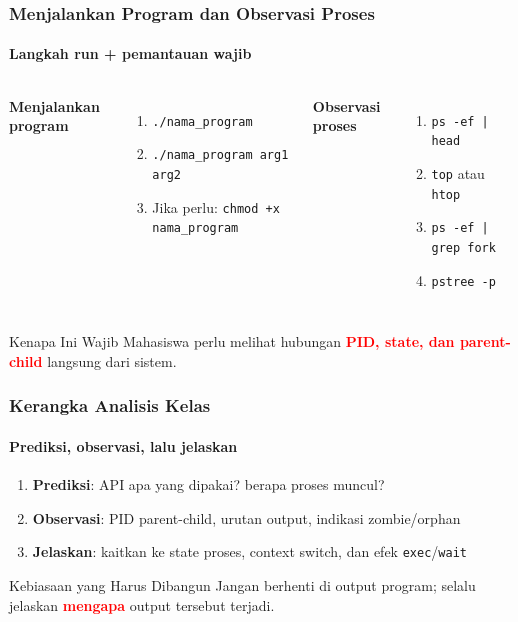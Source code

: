 \documentclass[t,aspectratio=169,xcolor=dvipsnames]{beamer}
\newcommand{\tem}[1]{\textbf{\textcolor{red}{#1}}}
\begin{document}
\begin{frame}
    \frametitle{Menjalankan Program dan Observasi Proses}
    \framesubtitle{Langkah run + pemantauan wajib}
    \small
    \begin{columns}[T]
        \textbf{Menjalankan program}
        \begin{enumerate}
            \item \texttt{./nama\_program}
            \item \texttt{./nama\_program arg1 arg2}
            \item Jika perlu: \texttt{chmod +x nama\_program}
        \end{enumerate}
        \textbf{Observasi proses}
        \begin{enumerate}
            \item \texttt{ps -ef | head}
            \item \texttt{top} atau \texttt{htop}
            \item \texttt{ps -ef | grep fork}
            \item \texttt{pstree -p}
        \end{enumerate}
    \end{columns}
    \begin{block}{Kenapa Ini Wajib}
        Mahasiswa perlu melihat hubungan \tem{PID, state, dan parent-child} langsung dari sistem.
    \end{block}
\end{frame}

\begin{frame}
    \frametitle{Kerangka Analisis Kelas}
    \framesubtitle{Prediksi, observasi, lalu jelaskan}
    \small
    \begin{enumerate}
        \item \textbf{Prediksi}: API apa yang dipakai? berapa proses muncul?
        \item \textbf{Observasi}: PID parent-child, urutan output, indikasi zombie/orphan
        \item \textbf{Jelaskan}: kaitkan ke state proses, context switch, dan efek \texttt{exec}/\texttt{wait}
    \end{enumerate}
    \begin{exampleblock}{Kebiasaan yang Harus Dibangun}
        Jangan berhenti di output program; selalu jelaskan \tem{mengapa} output tersebut terjadi.
    \end{exampleblock}
\end{frame}
\end{document}
